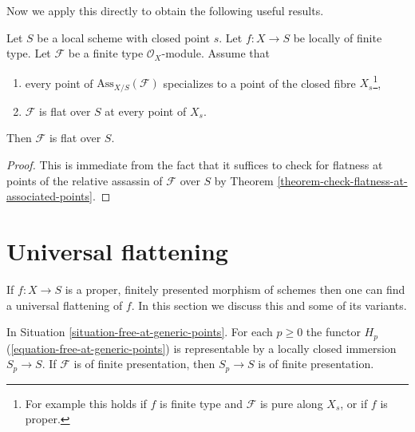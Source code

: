 \noindent
Now we apply this directly to obtain the following useful results.

\begin{lemma}
\label{lemma-check-along-closed-fibre}
Let $S$ be a local scheme with closed point $s$.
Let $f : X \to S$ be locally of finite type.
Let $\mathcal{F}$ be a finite type $\mathcal{O}_X$-module.
Assume that
\begin{enumerate}
\item every point of $\text{Ass}_{X/S}(\mathcal{F})$ specializes
to a point of the closed fibre $X_s$\footnote{For example this holds if
$f$ is finite type and $\mathcal{F}$ is pure along $X_s$, or
if $f$ is proper.},
\item $\mathcal{F}$ is flat over $S$ at every point of $X_s$.
\end{enumerate}
Then $\mathcal{F}$ is flat over $S$.
\end{lemma}

\begin{proof}
This is immediate from the fact that it suffices to check for
flatness at points of the relative assassin of $\mathcal{F}$
over $S$ by
Theorem \ref{theorem-check-flatness-at-associated-points}.
\end{proof}











\section{Universal flattening}
\label{section-flattening-final}

\noindent
If $f : X \to S$ is a proper, finitely presented morphism
of schemes then one can find a universal flattening of $f$.
In this section we discuss this and some of its variants.

\begin{lemma}
\label{lemma-free-at-generic-points-representable}
In Situation \ref{situation-free-at-generic-points}.
For each $p \geq 0$ the functor $H_p$
(\ref{equation-free-at-generic-points}) is representable
by a locally closed immersion $S_p \to S$. If $\mathcal{F}$
is of finite presentation, then $S_p \to S$ is of finite presentation.
\end{lemma}

